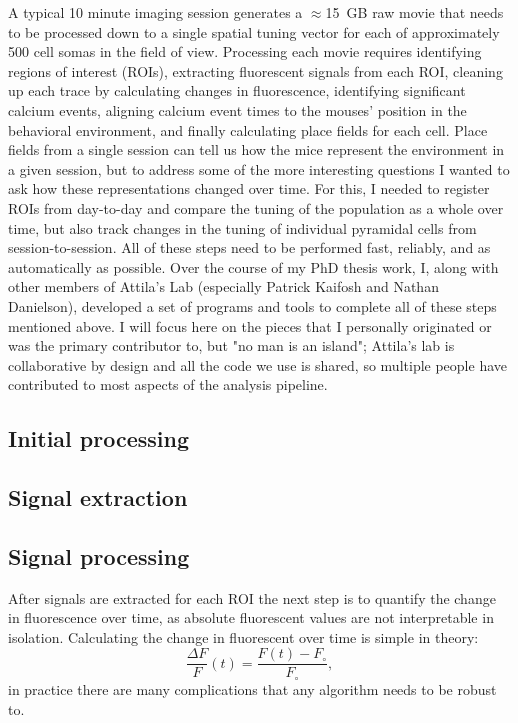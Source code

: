 A typical 10 minute imaging session generates a $\approx$15~GB raw movie that needs to be processed down to a single spatial tuning vector for each of approximately 500 cell somas in the field of view.
Processing each movie requires identifying regions of interest (ROIs), extracting fluorescent signals from each ROI, cleaning up each trace by calculating changes in fluorescence, identifying significant calcium events, aligning calcium event times to the mouses' position in the behavioral environment, and finally calculating place fields for each cell.
Place fields from a single session can tell us how the mice represent the environment in a given session, but to address some of the more interesting questions I wanted to ask how these representations changed over time.
For this, I needed to register ROIs from day-to-day and compare the tuning of the population as a whole over time, but also track changes in the tuning of individual pyramidal cells from session-to-session.
All of these steps need to be performed fast, reliably, and as automatically as possible.
Over the course of my PhD thesis work, I, along with other members of Attila's Lab (especially Patrick Kaifosh and Nathan Danielson), developed a set of programs and tools to complete all of these steps mentioned above.
I will focus here on the pieces that I personally originated or was the primary contributor to, but "no man is an island"; Attila's lab is collaborative by design and all the code we use is shared, so multiple people have contributed to most aspects of the analysis pipeline.

\subsection{Initial processing}

\subsection{Signal extraction}

\subsection{Signal processing}
After signals are extracted for each ROI the next step is to quantify the change in fluorescence over time, as absolute fluorescent values are not interpretable in isolation.
Calculating the change in fluorescent over time is simple in theory: $$\frac{\Delta F}{F}(t) = \frac{F(t) - F_{\circ}}{F_{\circ}},$$ in practice there are many complications that any algorithm needs to be robust to.
\citep{Jia2011}

